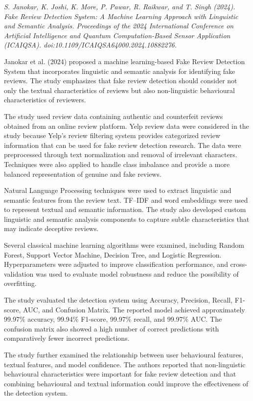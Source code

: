 \documentclass[12pt,a4paper]{report}
\begin{document}
\textit{S. Janokar, K. Joshi, K. More, P. Pawar, R. Raikwar, and T. Singh (2024). Fake Review Detection System: A Machine Learning Approach with Linguistic and Semantic Analysis. Proceedings of the 2024 International Conference on Artificial Intelligence and Quantum Computation-Based Sensor Application (ICAIQSA). doi:10.1109/ICAIQSA64000.2024.10882276.}

Janokar et al. (2024) proposed a machine learning-based Fake Review Detection System that incorporates linguistic and semantic analysis for identifying fake reviews. The study emphasizes that fake review detection should consider not only the textual characteristics of reviews but also non-linguistic behavioural characteristics of reviewers.

The study used review data containing authentic and counterfeit reviews obtained from an online review platform. Yelp review data were considered in the study because Yelp's review filtering system provides categorized review information that can be used for fake review detection research. The data were preprocessed through text normalization and removal of irrelevant characters. Techniques were also applied to handle class imbalance and provide a more balanced representation of genuine and fake reviews.

Natural Language Processing techniques were used to extract linguistic and semantic features from the review text. TF--IDF and word embeddings were used to represent textual and semantic information. The study also developed custom linguistic and semantic analysis components to capture subtle characteristics that may indicate deceptive reviews.

Several classical machine learning algorithms were examined, including Random Forest, Support Vector Machine, Decision Tree, and Logistic Regression. Hyperparameters were adjusted to improve classification performance, and cross-validation was used to evaluate model robustness and reduce the possibility of overfitting.

The study evaluated the detection system using Accuracy, Precision, Recall, F1-score, AUC, and Confusion Matrix. The reported model achieved approximately 99.97\% accuracy, 99.94\% F1-score, 99.97\% recall, and 99.97\% AUC. The confusion matrix also showed a high number of correct predictions with comparatively fewer incorrect predictions.

The study further examined the relationship between user behavioural features, textual features, and model confidence. The authors reported that non-linguistic behavioural characteristics were important for fake review detection and that combining behavioural and textual information could improve the effectiveness of the detection system.
\end{document}
